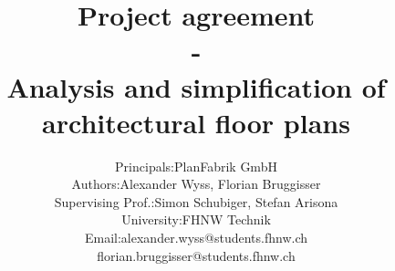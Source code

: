 \documentclass[11pt, a4paper]{report}
\begin{document}
	\title{\textbf{Project agreement \\ - \\Analysis and simplification of architectural floor plans}}
	\author{
			\begin{tabular}{l  l}
				Principals: & PlanFabrik GmbH \\
				Authors: & Alexander Wyss, Florian Bruggisser \\
				Supervising Prof.: & Simon Schubiger, Stefan Arisona \\ University: & FHNW Technik \\
				Email: & alexander.wyss@students.fhnw.ch \\ & florian.bruggisser@students.fhnw.ch				
			\end{tabular}
	}
	
	\maketitle
	\tableofcontents
	
	
	
	
	
	
	
\end{document}
